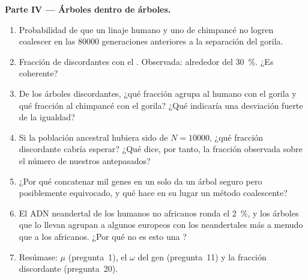 \begin{problem}
\medskip
\noindent\textbf{Parte IV --- Árboles dentro de árboles.}
\begin{enumerate}[resume]
  \item Probabilidad de que un linaje humano y uno de chimpancé no
        logren coalescer en las \num{80000} generaciones anteriores a la
        separación del gorila.
  \item Fracción de  discordantes con el . Observada: alrededor del \qty{30}{\%}. ¿Es coherente?
  \item De los árboles discordantes, ¿qué fracción agrupa al humano con
        el gorila y qué fracción al chimpancé con el gorila? ¿Qué
        indicaría una desviación fuerte de la igualdad?
  \item Si la población ancestral hubiera sido de $N = \num{10000}$, ¿qué
        fracción discordante cabría esperar? ¿Qué dice, por tanto, la
        fracción observada sobre el número de nuestros antepasados?
  \item ¿Por qué concatenar mil genes en un solo  da un
        árbol seguro pero posiblemente equivocado, y qué hace en su
        lugar un método coalescente?
  \item El ADN neandertal de los humanos no africanos ronda el
        \qty{2}{\%}, y los árboles que lo llevan agrupan a algunos
        europeos con los neandertales más a menudo que a los africanos.
        ¿Por qué no es esto una ?
  \item Resúmase: $\mu$ (pregunta~1), el $\omega$ del gen (pregunta~11)
        y la fracción discordante (pregunta~20).
\end{enumerate}
\end{problem}
